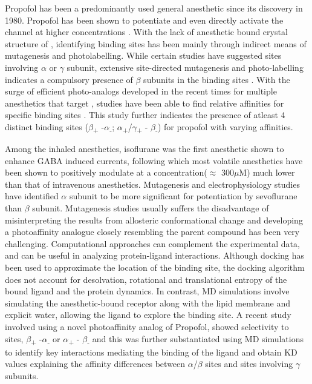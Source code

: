 \documentclass{biophys}
\begin{document}
Propofol has been a predominantly used general anesthetic since its discovery in 1980. Propofol has been shown to potentiate \GABAA \citep{Krasowski2001a} and even directly activate the channel at higher concentrations \citep{Hales1991,Orser1994}. With the lack of anesthetic bound crystal structure of \GABAA, identifying binding sites has been  mainly through indirect means of mutagenesis and photolabelling. While certain studies have suggested sites involving $\alpha$ or $\gamma$ subunit, extensive site-directed mutagenesis and photo-labelling indicates a compulsory presence of $\beta$ subunits in the binding sites \citep{Jurd2003a,Siegwart2003a,Krasowski2001,Bali2004,Yip2013,Jayakar2014}. With the surge of efficient photo-analogs developed in the recent times for multiple anesthetics that target \GABAA, studies have been able to find relative affinities for specific binding sites \citep{Chiara2013}.  This study further indicates the presence of atleast 4 distinct binding sites ($\beta$\textsubscript{+} -$\alpha$\textsubscript{-}; $\alpha$\textsubscript{+}/$\gamma$\textsubscript{+} - $\beta$\textsubscript{-}) for propofol with varying affinities. 

Among the inhaled anesthetics, isoflurane was the first anesthetic shown to enhance GABA induced currents\citep{Nakahiro1989a}, following which most volatile anesthetics have been shown to positively modulate \GABAA at a concentration($\approx$ 300$\mu$M) much lower than that of intravenous anesthetics\citep{Franks1996}. Mutagenesis and electrophysiology studies have identified  $\alpha$ subunit to be more significant for potentiation by sevoflurane than $\beta$ subunit\citep{Nishikawa2003b}. 
Mutagenesis studies usually suffers the disadvantage of misinterpreting the results from allosteric conformational change and developing a photoaffinity analogue closely resembling the parent compound has been very challenging. Computational approaches can complement the experimental data, and can be useful in analyzing protein-ligand interactions. Although docking has been used to approximate the location of the binding site, the docking algorithm does not account for desolvation, rotational and translational entropy of the bound ligand and the protein dynamics\citep{Murlidaran2018}. In contrast, MD simulations involve simulating the anesthetic-bound receptor along with the lipid membrane and explicit water, allowing the ligand to explore the binding site. A recent study involved using a novel photoaffinity analog of Propofol, showed selectivity to sites, $\beta$\textsubscript{+} -$\alpha$\textsubscript{-} or $\alpha$\textsubscript{+} - $\beta$\textsubscript{-} and this was further substantiated using MD simulations to identify key interactions mediating the binding of the ligand and obtain KD values explaining the affinity differences between $\alpha$/$\beta$ sites and sites involving $\gamma$ subunits.
\end{document}
